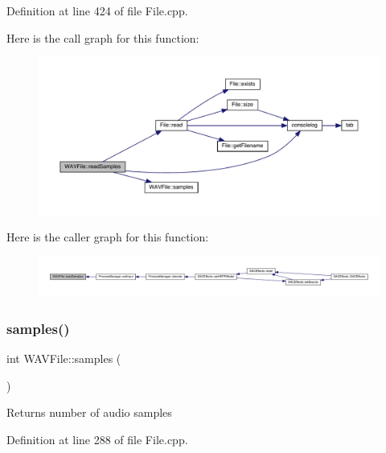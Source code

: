 Definition at line 424 of file File.\+cpp.

Here is the call graph for this function\+:
\nopagebreak
\begin{figure}[H]
\begin{center}
\leavevmode
\includegraphics[width=350pt]{class_w_a_v_file_aa14a22c094f310cecc33cc573507378c_cgraph}
\end{center}
\end{figure}
Here is the caller graph for this function\+:
\nopagebreak
\begin{figure}[H]
\begin{center}
\leavevmode
\includegraphics[width=350pt]{class_w_a_v_file_aa14a22c094f310cecc33cc573507378c_icgraph}
\end{center}
\end{figure}
\mbox{\label{class_w_a_v_file_a9ca294afee7e0c17ac00cd37b56dafd6}} 
\subsubsection{\texorpdfstring{samples()}{samples()}}
{\footnotesize\ttfamily int W\+A\+V\+File\+::samples (\begin{DoxyParamCaption}{ }\end{DoxyParamCaption})}

\begin{DoxyReturn}{Returns}
number of audio samples 
\end{DoxyReturn}


Definition at line 288 of file File.\+cpp.

